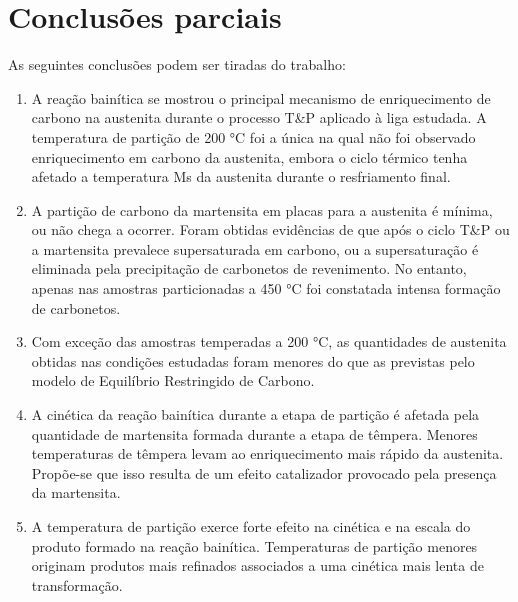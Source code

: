 \chapter{Conclusões parciais}

As seguintes conclusões podem ser tiradas do trabalho:

\begin{enumerate}
	\item A reação bainítica se mostrou o principal mecanismo de enriquecimento de carbono na austenita durante o processo T\&P aplicado à liga estudada. A temperatura de partição de 200 °C foi a única na qual não foi observado enriquecimento em carbono da austenita, embora o ciclo térmico tenha afetado a temperatura Ms da austenita  durante o resfriamento final.
	\item A partição de carbono da martensita em placas para a austenita é mínima, ou não chega a ocorrer. Foram obtidas evidências de que após o ciclo T\&P ou a martensita prevalece supersaturada em carbono, ou a supersaturação é eliminada pela precipitação de carbonetos de revenimento. No entanto, apenas nas amostras particionadas a 450 °C foi constatada intensa formação de carbonetos.
	\item Com exceção das amostras temperadas a 200 °C, as quantidades de austenita obtidas nas condições estudadas foram menores do que as previstas pelo modelo de Equilíbrio Restringido de Carbono.
	\item A cinética da reação bainítica durante a etapa de partição é afetada pela quantidade de martensita formada durante a etapa de têmpera. Menores temperaturas de têmpera levam ao enriquecimento mais rápido da austenita. Propõe-se que isso resulta de um efeito catalizador provocado pela presença da martensita.
	\item A temperatura de partição exerce forte efeito na cinética e na escala do produto formado na reação bainítica. Temperaturas de partição menores originam produtos mais refinados associados a uma cinética mais lenta de transformação.
\end{enumerate}